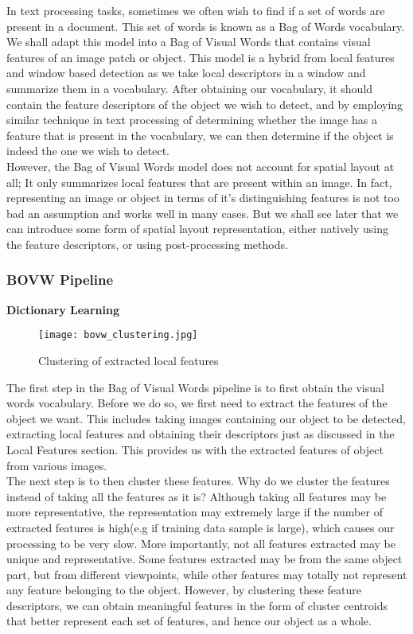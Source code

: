 \documentclass[12pt]{article}
\begin{document}
In text processing tasks, sometimes we often wish to find if a set of words are present in a document. This set of words is known as a Bag of Words vocabulary. We shall adapt this model into a Bag of Visual Words that contains visual features of an image patch or object. This model is a hybrid from local features and window based detection as we take local descriptors in a window and summarize them in a vocabulary. After obtaining our vocabulary, it should contain the feature descriptors of the object we wish to detect, and by employing similar technique in text processing of determining whether the image has a feature that is present in the vocabulary, we can then determine if the object is indeed the one we wish to detect. \\

However, the Bag of Visual Words model does not account for spatial layout at all; It only summarizes local features that are present within an image. In fact, representing an image or object in terms of it's distinguishing features is not too bad an assumption and works well in many cases. 
But we shall see later that we can introduce some form of spatial layout representation, either natively using the feature descriptors, or using post-processing methods.

\subsubsection{BOVW Pipeline}

\textbf{Dictionary Learning}\\

\begin{figure}[!htb]
\centering
  \texttt{[image: bovw\_clustering.jpg]}
  \caption{Clustering of extracted local features}
  \label{fig:bovw_clsutering}
\end{figure}

The first step in  the Bag of Visual Words pipeline is to first obtain the visual words vocabulary. Before we do so, we first need to extract the features of the object we want. This includes taking images containing our object to be detected, extracting local features and obtaining their descriptors just as discussed in the Local Features section. This provides us with the extracted features of object from various images. \\

The next step is to then cluster these features. Why do we cluster the features instead of taking all the features as it is? Although taking all features may be more representative, the representation may extremely large if the number of extracted features is high(e.g if training data sample is large), which causes our processing to be very slow. More importantly, not all features extracted may be unique and representative. Some features extracted may be from the same object part, but from different viewpoints, while other features may totally not represent any feature belonging to the object. However, by clustering these feature descriptors, we can obtain meaningful features in the form of cluster centroids that better represent each set of features, and hence our object as a whole.\\
\end{document}
